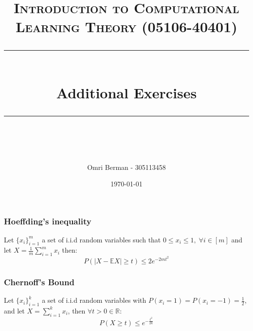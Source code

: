 \documentclass{article} %
\title{
\normalfont \normalsize 
\textsc{Introduction to Computational Learning Theory (05106-40401)} \\
[10pt] 
\rule{\linewidth}{0.5pt} \\[6pt] 
\huge Additional Exercises \\
\rule{\linewidth}{2pt}  \\[10pt]
}
\author{Omri Berman - 305113458}
\date{\normalsize \today}
\begin{document}
\maketitle
\noindent

\subsubsection*{Hoeffding's inequality}
Let $\{x_i\}_{i=1}^m$ a set of i.i.d random variables such that $0 \leq x_i \leq 1, \; \forall i \in [m]$ and let $X = \frac{1}{m} \sum_{i=1}^m x_i$ then:
\begin{equation*}
    P(|X - \mathbb{E}X| \geq t) \leq 2e^{-2mt^2}
\end{equation*}

\subsubsection*{Chernoff's Bound}
Let $\{x_i\}_{i=1}^k$ a set of i.i.d random variables with $P(x_i=1)= P(x_i=-1) = \frac{1}{2}$, and let $X = \sum_{i=1}^k x_i$, then $\forall t>0 \in \mathbb{R}$:
\begin{equation*}
    P(X\geq t) \leq e^{-\frac{t^2}{2k}}
\end{equation*}
\end{document}
